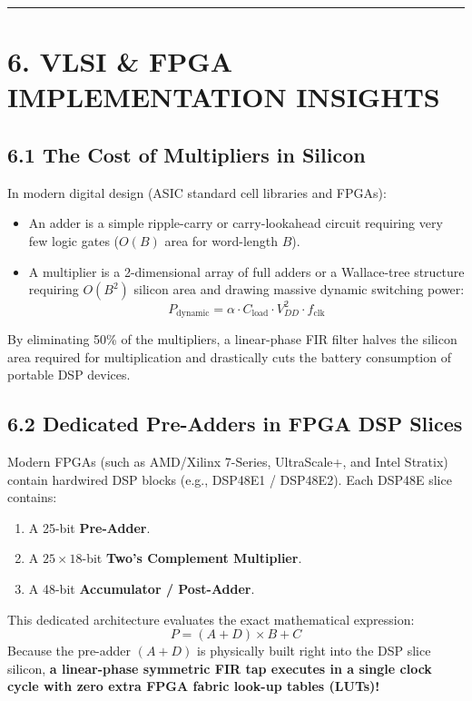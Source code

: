 \documentclass[11pt,a4paper]{article}
\begin{document}
\noindent\rule{\textwidth}{0.5pt}

\section{6. VLSI \& FPGA IMPLEMENTATION INSIGHTS}

\subsection{6.1 The Cost of Multipliers in Silicon}
In modern digital design (ASIC standard cell libraries and FPGAs):
\begin{itemize}
    \item An adder is a simple ripple-carry or carry-lookahead circuit requiring very few logic gates ($O(B)$ area for word-length $B$).
    \item A multiplier is a 2-dimensional array of full adders or a Wallace-tree structure requiring $O(B^2)$ silicon area and drawing massive dynamic switching power:
    \begin{equation}
    P_{\text{dynamic}} = \alpha \cdot C_{\text{load}} \cdot V_{DD}^2 \cdot f_{\text{clk}}
    \end{equation}
\end{itemize}
By eliminating 50\% of the multipliers, a linear-phase FIR filter halves the silicon area required for multiplication and drastically cuts the battery consumption of portable DSP devices.

\subsection{6.2 Dedicated Pre-Adders in FPGA DSP Slices}
Modern FPGAs (such as AMD/Xilinx 7-Series, UltraScale+, and Intel Stratix) contain hardwired DSP blocks (e.g., DSP48E1 / DSP48E2). 
Each DSP48E slice contains:
\begin{enumerate}
    \item A 25-bit \textbf{Pre-Adder}.
    \item A $25 \times 18$-bit \textbf{Two's Complement Multiplier}.
    \item A 48-bit \textbf{Accumulator / Post-Adder}.
\end{enumerate}
This dedicated architecture evaluates the exact mathematical expression:
\begin{equation}
P = (A + D) \times B + C
\end{equation}
Because the pre-adder $(A + D)$ is physically built right into the DSP slice silicon, \textbf{a linear-phase symmetric FIR tap executes in a single clock cycle with zero extra FPGA fabric look-up tables (LUTs)!}
\end{document}
